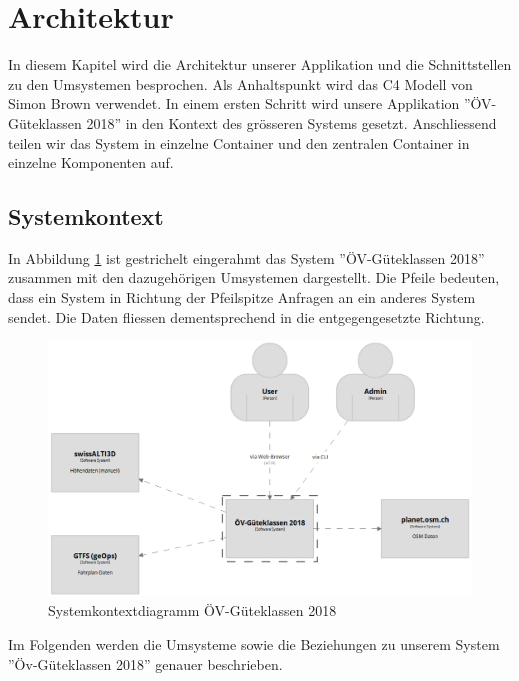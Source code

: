 
\section{Architektur}
\label{Architektur}

In diesem Kapitel wird die Architektur unserer Applikation und die Schnittstellen zu den Umsystemen besprochen.
Als Anhaltspunkt wird das C4 Modell \cite{c4model} von Simon Brown verwendet.
In einem ersten Schritt wird unsere Applikation ''ÖV-Güteklassen 2018'' in den Kontext des grösseren Systems gesetzt.
Anschliessend teilen wir das System  in einzelne Container und den zentralen Container  in einzelne Komponenten auf.

\subsection{Systemkontext}
\label{Architektur:Systemkontext}

In Abbildung \ref{fig:system-context-diagram} ist gestrichelt eingerahmt das System ''ÖV-Güteklassen 2018'' zusammen mit den dazugehörigen Umsystemen dargestellt.
Die Pfeile bedeuten, dass ein System in Richtung der Pfeilspitze Anfragen an ein anderes System sendet.
Die Daten fliessen dementsprechend in die entgegengesetzte Richtung.

\begin{figure}[ht]
    \centering
    \includegraphics[width=1\linewidth]{projectdoc/img/systemcontext-diagram.png}
    \caption[Systemkontextdiagramm]{Systemkontextdiagramm ÖV-Güteklassen 2018}
    \label{fig:system-context-diagram}
\end{figure}

Im Folgenden werden die Umsysteme sowie die Beziehungen zu unserem System ''Öv-Güteklassen 2018'' genauer beschrieben.

